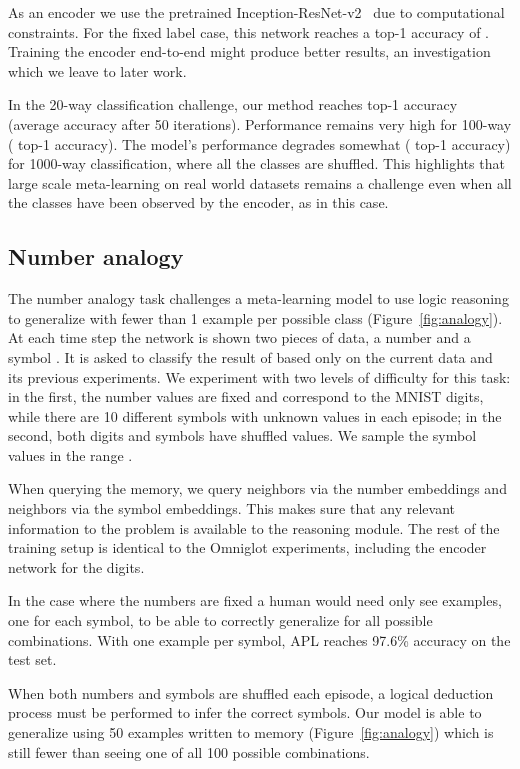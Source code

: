 \documentclass{article} \usepackage{iclr2019_conference,times}
\begin{document}
As an encoder we use the pretrained Inception-ResNet-v2~\citep{szegedy2017inception} due to computational constraints. For the fixed label case, this network reaches a top-1 accuracy of . Training the encoder end-to-end might produce better results, an investigation which we leave to later work.

In the 20-way classification challenge, our method reaches  top-1 accuracy (average accuracy after 50 iterations). Performance remains very high for 100-way ( top-1 accuracy). The model's performance degrades somewhat ( top-1 accuracy) for 1000-way classification, where all the classes are shuffled. This highlights that large scale meta-learning on real world datasets remains a challenge even when all the classes have been observed by the encoder, as in this case.

\subsection{Number analogy}



The number analogy task challenges a meta-learning model to use logic reasoning to generalize with fewer than 1 example per possible class (Figure~\ref{fig:analogy}). At each time step the network is shown two pieces of data, a number  and a symbol . It is asked to classify the result of  based only on the current data and its previous experiments. 
We experiment with two levels of difficulty for this task: in the first, the number values are fixed and correspond to the MNIST digits, while there are 10 different symbols with unknown values in each episode; in the second, both digits and symbols have shuffled values. We sample the symbol values in the range .

When querying the memory, we query  neighbors via the number embeddings and  neighbors via the symbol embeddings. This makes sure that any relevant information to the problem is available to the reasoning module. The rest of the training setup is identical to the Omniglot experiments, including the encoder network for the digits.

In the case where the numbers are fixed a human would need only see  examples, one for each symbol, to be able to correctly generalize for all  possible combinations. With one example per symbol, APL reaches 97.6\% accuracy on the test set.

 
When both numbers and symbols are shuffled each episode, a logical deduction process must be performed to infer the correct symbols. Our model is able to generalize using 50 examples written to memory (Figure~\ref{fig:analogy}) which is still fewer than seeing one of all 100 possible combinations.
\end{document}
